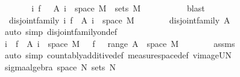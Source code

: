 \begin{isabellebody}
\ \ \ \ \isamarkupfalse%
\ \isamarkupfalse%
\ {\isachardoublequoteopen}{\isacharparenleft}{\kern0pt}{\isasymUnion}i{\isachardot}{\kern0pt}\ f\ {\isacharminus}{\kern0pt}{\isacharbackquote}{\kern0pt}\ \ A\ i\ {\isasyminter}\ space\ M{\isacharparenright}{\kern0pt}\ {\isasymin}\ sets\ M{\isachardoublequoteclose}\isanewline
\ \ \ \ \ \ \isamarkupfalse%
\ {\isacharasterisk}{\kern0pt}\ \isamarkupfalse%
\ blast\isanewline
\ \ \ \ \isamarkupfalse%
\ \isamarkupfalse%
\ {\isacharasterisk}{\kern0pt}{\isacharasterisk}{\kern0pt}{\isacharcolon}{\kern0pt}\ {\isachardoublequoteopen}disjoint{\isacharunderscore}{\kern0pt}family\ {\isacharparenleft}{\kern0pt}{\isasymlambda}i{\isachardot}{\kern0pt}\ f\ {\isacharminus}{\kern0pt}{\isacharbackquote}{\kern0pt}\ A\ i\ {\isasyminter}\ space\ M{\isacharparenright}{\kern0pt}{\isachardoublequoteclose}\isanewline
\ \ \ \ \ \ \isamarkupfalse%
\ {\isacartoucheopen}disjoint{\isacharunderscore}{\kern0pt}family\ A{\isacartoucheclose}\ \isamarkupfalse%
\ {\isacharparenleft}{\kern0pt}auto\ simp{\isacharcolon}{\kern0pt}\ disjoint{\isacharunderscore}{\kern0pt}family{\isacharunderscore}{\kern0pt}on{\isacharunderscore}{\kern0pt}def{\isacharparenright}{\kern0pt}\isanewline
\ \ \ \ \isamarkupfalse%
\ \isamarkupfalse%
\ {\isachardoublequoteopen}{\isacharparenleft}{\kern0pt}{\isasymSum}i{\isachardot}{\kern0pt}\ {\isasymmu}\ {\isacharparenleft}{\kern0pt}f\ {\isacharminus}{\kern0pt}{\isacharbackquote}{\kern0pt}\ A\ i\ {\isasyminter}\ space\ M{\isacharparenright}{\kern0pt}{\isacharparenright}{\kern0pt}\ {\isacharequal}{\kern0pt}\ {\isasymmu}\ {\isacharparenleft}{\kern0pt}f\ {\isacharminus}{\kern0pt}{\isacharbackquote}{\kern0pt}\ {\isasymUnion}\ {\isacharparenleft}{\kern0pt}range\ A{\isacharparenright}{\kern0pt}\ {\isasyminter}\ space\ M{\isacharparenright}{\kern0pt}{\isachardoublequoteclose}\isanewline
\ \ \ \ \ \ \isamarkupfalse%
\ assms{\isacharparenleft}{\kern0pt}{}{\isacharparenright}{\kern0pt}\ \isamarkupfalse%
\ {\isacharparenleft}{\kern0pt}auto\ simp{\isacharcolon}{\kern0pt}\ countably{\isacharunderscore}{\kern0pt}additive{\isacharunderscore}{\kern0pt}def\ measure{\isacharunderscore}{\kern0pt}space{\isacharunderscore}{\kern0pt}def\ vimage{\isacharunderscore}{\kern0pt}UN{\isacharparenright}{\kern0pt}\isanewline
\ \ \isamarkupfalse%
\isanewline
\ \ \isamarkupfalse%
\ {\isachardoublequoteopen}sigma{\isacharunderscore}{\kern0pt}algebra\ {\isacharparenleft}{\kern0pt}space\ N{\isacharparenright}{\kern0pt}\ {\isacharparenleft}{\kern0pt}sets\ N{\isacharparenright}{\kern0pt}{\isachardoublequoteclose}\isanewline

\end{isabellebody}
